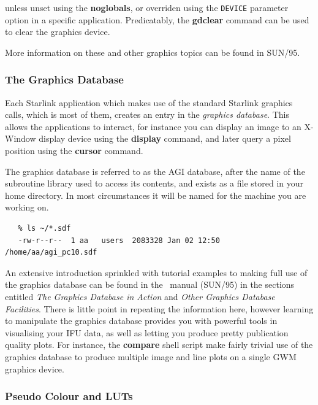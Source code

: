 \documentclass[twoside,11pt]{article}
\newcommand{\xref}[3]{#1}
\begin{document}
{unless unset using the \xref{{\bf noglobals}}{sun95}{NOGLOBALS}, or
overriden using the {\tt DEVICE} parameter option in a specific
application.  Predicatably, the \xref{{\bf gdclear}}{sun95}{GDCLEAR}
command can be used to clear the graphics device.

More information on these and other graphics topics can be found in
\xref{SUN/95}{sun95}{}.

\subsubsection{The Graphics Database}

Each Starlink application which makes use of the standard Starlink
graphics calls, which is most of them, creates an entry in the
{\em graphics database}.  This allows the applications to interact, for
instance you can display an image to an X-Window display device using
the {\bf display} command, and later query a pixel position using the 
{\bf cursor} command.

The graphics database is referred to as the AGI database, after the
name of the \xref{subroutine library}{sun48}{} used to access its
contents, and exists as a file stored in your home directory.  In most
circumstances it will be named for the machine you are working on.

\small\begin{verbatim}
   % ls ~/*.sdf
   -rw-r--r--  1 aa   users  2083328 Jan 02 12:50  /home/aa/agi_pc10.sdf
\end{verbatim}\normalsize

An extensive introduction sprinkled with tutorial examples to making
full use of the \xref{graphics database}{sun95}{se_agitate} can be
found in the \KAPPA\ manual (SUN/95) in the sections entitled
\xref{{\em The Graphics Database in Action}}{sun95}{se_agiaction} and
\xref{{\em Other Graphics Database Facilities}}{sun95}{se_agiother}.
There is little point in repeating the information here, however
learning to manipulate the graphics database provides you with
powerful tools in visualising your IFU data, as well as letting you
produce pretty publication quality plots.  For instance, the \xref{{\bf
compare}}{sun237}{compare} shell script make fairly trivial use of the
graphics database to produce multiple image and line plots on a
single GWM graphics device.

\subsubsection{Pseudo Colour and LUTs}

}
\end{document}
